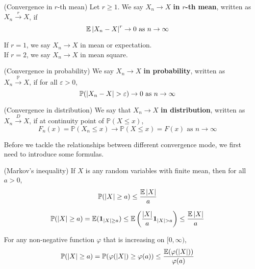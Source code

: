 \documentclass{huhtakm-template-book}
\newcommand{\prob}{\mathbb{P}}
\newcommand{\expect}{\mathbb{E}}
\begin{document}
\begin{defn}(Convergence in $r$-th mean)
	Let $r\geq 1$. We say $X_{n}\to X$ \textbf{in $r$-th mean}, written as $X_{n}\xrightarrow{r}X$, if
	\begin{equation*}
		\expect\abs{X_{n}-X}^{r}\to 0\text{ as }n\to\infty
	\end{equation*}
\end{defn}
\begin{eg}
	If $r=1$, we say $X_{n}\to X$ in mean or expectation.\\
	If $r=2$, we say $X_{n}\to X$ in mean square.
\end{eg}
\begin{defn}(Convergence in probability)
	We say $X_{n}\to X$ \textbf{in probability}, written as $X_{n}\xrightarrow{\prob}X$, if for all $\varepsilon>0$,
	\begin{equation*}
		\prob(\abs{X_{n}-X}>\varepsilon)\to 0\text{ as }n\to\infty
	\end{equation*}
\end{defn}
\begin{defn}(Convergence in distribution)
	We say that $X_{n}\to X$ \textbf{in distribution}, written as $X_{n}\xrightarrow{D}X$, if at continuity point of $\prob(X\leq x)$,
	\begin{equation*}
		F_{n}(x)=\prob(X_{n}\leq x)\to\prob(X\leq x)=F(x)\text{ as }n\to\infty
	\end{equation*}
\end{defn}
Before we tackle the relationships between different convergence mode, we first need to introduce some formulas.
\begin{lem}(Markov's inequality)
	If $X$ is any random variables with finite mean, then for all $a>0$,
	\begin{equation*}
		\prob(\abs{X}\geq a)\leq\frac{\expect\abs{X}}{a}
	\end{equation*}
\end{lem}
\begin{proofing}
	\begin{equation*}
		\prob(\abs{X}\geq a)=\expect(\mathbf{1}_{\abs{X}\geq a})\leq\expect\left(\frac{\abs{X}}{a}\mathbf{1}_{\abs{X}>a}\right)\leq\frac{\expect\abs{X}}{a}
	\end{equation*}
\end{proofing}
\begin{rem}
	For any non-negative function $\varphi$ that is increasing on $[0,\infty)$,
	\begin{equation*}
		\prob(\abs{X}\geq a)=\prob(\varphi(\abs{X})\geq\varphi(a))\leq\frac{\expect(\varphi(\abs{X}))}{\varphi(a)}
	\end{equation*}
\end{rem}
\end{document}
